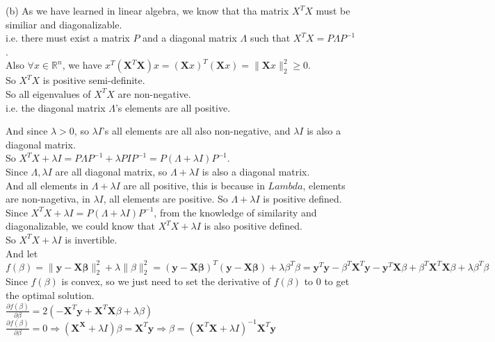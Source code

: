 \documentclass[10pt]{article}
\begin{document}
\begin{enumerate}[1.]
(b) As we have learned in linear algebra, we know that tha matrix
$X^TX$ must be similiar and diagonalizable.\\
i.e. there must exist a matrix $P$ and a diagonal matrix $\Lambda$ such that $X^TX=P\Lambda P^{-1}$.\\
Also $\forall x\in\mathbb{R}^n$, we have $x^T(\mathbf{X}^T\mathbf{X}) x=(\mathbf{X}x)^T(\mathbf{X}x)=\|\mathbf{X}x\|_2^2\geq0$.\\
So $X^TX$ is positive semi-definite.\\
So all eigenvalues of $X^TX$ are non-negative.\\
i.e. the diagonal matrix $\Lambda$'s elements are all positive.

And since $\lambda>0$, so $\lambda I$'s all elements are all also non-negative, and $\lambda I$ is also a diagonal matrix.\\
So $X^TX+\lambda I=P\Lambda P^{-1}+\lambda PIP^{-1}=P(\Lambda+\lambda I)P^{-1}$.\\
Since $\Lambda, \lambda I$ are all diagonal matrix, so $\Lambda+\lambda I$ is also a diagonal matrix.\\
And all elements in $\Lambda+\lambda I$ are all positive, this is because in $Lambda$, elements are non-nagetiva, in $\lambda I$, all elements are positive.
So $\Lambda+\lambda I$ is positive defined.\\
Since $X^TX+\lambda I=P(\Lambda+\lambda I)P^{-1}$,
from the knowledge of similarity and diagonalizable, we could know that $X^TX+\lambda I$ is also positive defined.\\
So $X^TX+\lambda I$ is invertible.\\

And let $f(\beta)=\|\mathbf{y}-\mathbf{X}\mathbf{\beta}\|_2^2 + \lambda\|\beta\|_2^2=(\mathbf{y}-\mathbf{X}\mathbf{\beta})^T(\mathbf{y}-\mathbf{X}\mathbf{\beta})+\lambda\beta^T\beta=\mathbf{y}^T\mathbf{y}-\beta^T\mathbf{X}^T\mathbf{y}-\mathbf{y}^T\mathbf{X}\beta+\beta^T\mathbf{X}^T\mathbf{X}\beta+\lambda\beta^T\beta$\\
Since $f(\beta)$ is convex, so we just need to set the derivative of $f(\beta)$ to 0 to get the optimal solution.\\
$\frac{\partial f(\beta)}{\partial \beta}=2(-\mathbf{X}^T\mathbf{y}+\mathbf{X}^T\mathbf{X}\beta+\lambda\beta)$\\
$\frac{\partial f(\beta)}{\partial \beta}=0\Rightarrow (\mathbf{X}^\mathbf{X}+\lambda I)\beta=\mathbf{X}^T\mathbf{y}\Rightarrow \beta=(\mathbf{X}^T\mathbf{X}+\lambda I)^{-1}\mathbf{X}^T\mathbf{y}$\\


\end{enumerate}
\end{document}
